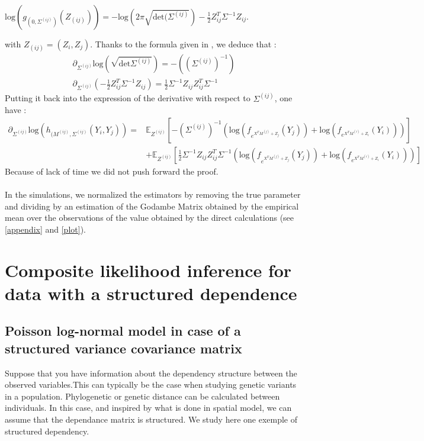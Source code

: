 \documentclass[11pt, a4paper]{article}
\begin{document}
\begin{center}
$\mathrm{log} (g_{(0,\Sigma^{(ij)})} (Z_{(ij)})) = -\mathrm{log} (2 \pi \sqrt{\mathrm{det}(\Sigma^{(ij)}}) - \frac{1}{2} Z_{ij}^T \Sigma ^{-1} Z_{ij}$.
\end{center} 
with $Z_{(ij)} = (Z_i,Z_j)$.
Thanks to the formula given in \cite{petersen2008matrix}, we deduce that :
\begin{align*}
\partial_{\Sigma^{(ij)} } \mathrm{log} (\sqrt{\mathrm{det} \Sigma^{(ij)}}) = - ((\Sigma^{(ij)})^{-1})\\
\partial_{\Sigma^{(ij)} } (- \frac{1}{2} Z_{ij}^T \Sigma^{-1} Z_{ij} ) = \frac{1}{2} \Sigma^{-1} Z_{ij} Z_{ij}^T \Sigma^{-1}
\end{align*}
Putting it back into the expression of the derivative with respect to $\Sigma ^{(ij)}$, one have :
\begin{align*}
\partial_{\Sigma^{(ij)}} \mathrm{log}(h_{(M^{(ij)},\Sigma^{(ij)}} (Y_i,Y_j)) = & \mathbb{E}_{Z^{(ij)}} [ - (\Sigma^{(ij)})^{-1} ( \mathrm{log} (f_{e^{X^TM^{(j)}+Z_j}}(Y_j)) +  \mathrm{log}(f_{e^{X^TM^{(i)}+Z_i}} (Y_i) ) ) ] \\
& + \mathbb{E}_{Z^{(ij)}} [\frac{1}{2} \Sigma^{-1} Z_{ij} Z_{ij}^T \Sigma^{-1} ( \mathrm{log} (f_{e^{X^TM^{(j)}+Z_j}}(Y_j)) +  \mathrm{log}(f_{e^{X^TM^{(i)}+Z_i}} (Y_i) ) )]
\end{align*}
Because of lack of time we did not push forward the proof.\\
\\
In the simulations, we normalized the estimators by removing the true parameter and dividing by an estimation of the Godambe Matrix obtained by the empirical mean over the observations of the value obtained by the direct calculations (see \ref{appendix} and \ref{plot}).
\section{Composite likelihood inference for data with a structured dependence}
\subsection{Poisson log-normal model in case of a structured variance covariance matrix}
Suppose that you have information about the dependency structure between the observed variables.This can typically be the case when studying genetic variants in a population. Phylogenetic \cite{pavoine2008testing} or genetic distance \cite{NEI2001828} can be calculated between individuals. In this case, and inspired by what is done in spatial model, we can assume that the dependance matrix is structured. We study here one exemple of structured dependency.
\end{document}
